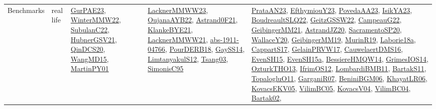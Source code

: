 {\begin{longtable}{llp{6cm}p{6cm}p{6cm}}
Benchmarks & real life & \href{articles/GurPAE23.pdf}{GurPAE23}\cite{GurPAE23}, \href{papers/WinterMMW22.pdf}{WinterMMW22}\cite{WinterMMW22}, \href{articles/SubulanC22.pdf}{SubulanC22}\cite{SubulanC22}, \href{articles/HubnerGSV21.pdf}{HubnerGSV21}\cite{HubnerGSV21}, \href{articles/QinDCS20.pdf}{QinDCS20}\cite{QinDCS20}, \href{articles/WangMD15.pdf}{WangMD15}\cite{WangMD15}, \href{articles/MartinPY01.pdf}{MartinPY01}\cite{MartinPY01} & \href{articles/LacknerMMWW23.pdf}{LacknerMMWW23}\cite{LacknerMMWW23}, \href{papers/OujanaAYB22.pdf}{OujanaAYB22}\cite{OujanaAYB22}, \href{papers/Astrand0F21.pdf}{Astrand0F21}\cite{Astrand0F21}, \href{papers/KlankeBYE21.pdf}{KlankeBYE21}\cite{KlankeBYE21}, \href{papers/LacknerMMWW21.pdf}{LacknerMMWW21}\cite{LacknerMMWW21}, \href{articles/abs-1911-04766.pdf}{abs-1911-04766}\cite{abs-1911-04766}, \href{articles/PourDERB18.pdf}{PourDERB18}\cite{PourDERB18}, \href{papers/GaySS14.pdf}{GaySS14}\cite{GaySS14}, \href{articles/LimtanyakulS12.pdf}{LimtanyakulS12}\cite{LimtanyakulS12}, \href{articles/Tsang03.pdf}{Tsang03}\cite{Tsang03}, \href{papers/SimonisC95.pdf}{SimonisC95}\cite{SimonisC95} & \href{articles/PrataAN23.pdf}{PrataAN23}\cite{PrataAN23}, \href{papers/EfthymiouY23.pdf}{EfthymiouY23}\cite{EfthymiouY23}, \href{papers/PovedaAA23.pdf}{PovedaAA23}\cite{PovedaAA23}, \href{articles/IsikYA23.pdf}{IsikYA23}\cite{IsikYA23}, \href{papers/BoudreaultSLQ22.pdf}{BoudreaultSLQ22}\cite{BoudreaultSLQ22}, \href{papers/GeitzGSSW22.pdf}{GeitzGSSW22}\cite{GeitzGSSW22}, \href{articles/CampeauG22.pdf}{CampeauG22}\cite{CampeauG22}, \href{papers/GeibingerMM21.pdf}{GeibingerMM21}\cite{GeibingerMM21}, \href{articles/AstrandJZ20.pdf}{AstrandJZ20}\cite{AstrandJZ20}, \href{articles/SacramentoSP20.pdf}{SacramentoSP20}\cite{SacramentoSP20}, \href{articles/WallaceY20.pdf}{WallaceY20}\cite{WallaceY20}, \href{papers/GeibingerMM19.pdf}{GeibingerMM19}\cite{GeibingerMM19}, \href{papers/MurinR19.pdf}{MurinR19}\cite{MurinR19}, \href{papers/Laborie18a.pdf}{Laborie18a}\cite{Laborie18a}, \href{papers/CappartS17.pdf}{CappartS17}\cite{CappartS17}, \href{papers/GelainPRVW17.pdf}{GelainPRVW17}\cite{GelainPRVW17}, \href{papers/CauwelaertDMS16.pdf}{CauwelaertDMS16}\cite{CauwelaertDMS16}, \href{papers/EvenSH15.pdf}{EvenSH15}\cite{EvenSH15}, \href{articles/EvenSH15a.pdf}{EvenSH15a}\cite{EvenSH15a}, \href{papers/BessiereHMQW14.pdf}{BessiereHMQW14}\cite{BessiereHMQW14}, \href{articles/GrimesIOS14.pdf}{GrimesIOS14}\cite{GrimesIOS14}, \href{articles/OzturkTHO13.pdf}{OzturkTHO13}\cite{OzturkTHO13}, \href{papers/IfrimOS12.pdf}{IfrimOS12}\cite{IfrimOS12}, \href{papers/LombardiBMB11.pdf}{LombardiBMB11}\cite{LombardiBMB11}, \href{articles/BartakS11.pdf}{BartakS11}\cite{BartakS11}, \href{articles/TopalogluO11.pdf}{TopalogluO11}\cite{TopalogluO11}, \href{papers/GarganiR07.pdf}{GarganiR07}\cite{GarganiR07}, \href{papers/BeniniBGM06.pdf}{BeniniBGM06}\cite{BeniniBGM06}, \href{articles/KhayatLR06.pdf}{KhayatLR06}\cite{KhayatLR06}, \href{papers/KovacsEKV05.pdf}{KovacsEKV05}\cite{KovacsEKV05}, \href{articles/VilimBC05.pdf}{VilimBC05}\cite{VilimBC05}, \href{papers/KovacsV04.pdf}{KovacsV04}\cite{KovacsV04}, \href{papers/VilimBC04.pdf}{VilimBC04}\cite{VilimBC04}, \href{papers/Bartak02.pdf}{Bartak02}\cite{Bartak02}, 
\end{longtable}}
